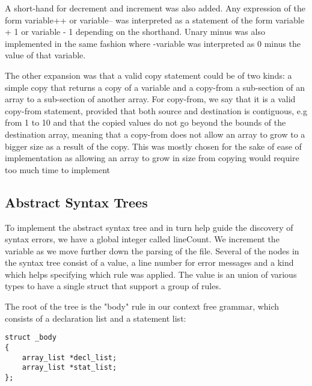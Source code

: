 \documentclass{article}
\begin{document}
A short-hand for decrement and increment was also added. Any expression of the form variable++ or variable-- was interpreted as a statement of the form variable + 1 or variable - 1 depending on the shorthand. Unary minus was also implemented in the same fashion where -variable was interpreted as 0 minus the value of that variable.

The other expansion was that a valid copy statement could be of two kinds: a simple copy that returns a copy of a variable and a copy-from a sub-section of an array to a sub-section of another array. For copy-from, we say that it is a valid copy-from statement, provided that both source and destination is contiguous, e.g from 1 to 10 and that the copied values do not go beyond the bounds of the destination array, meaning that a copy-from does not allow an array to grow to a bigger size as a result of the copy. This was mostly chosen for the sake of ease of implementation as allowing an array to grow in size from copying would require too much time to implement
\newline 
\newline 


\subsection{Abstract Syntax Trees}


To implement the abstract syntax tree and in turn help guide the discovery of syntax errors, we have a global integer called lineCount. We increment the variable as we move further down the parsing of the file. Several of the nodes in the syntax tree consist of a value, a line number for error messages and a kind which helps specifying which rule was applied. The value is an union of various types to have a single struct that support a group of rules.

The root of the tree is the "body" rule in our context free grammar, which consists of a declaration list and a statement list:
\begin{lstlisting}
struct _body
{
    array_list *decl_list;
    array_list *stat_list;
};
\end{lstlisting}
\end{document}
